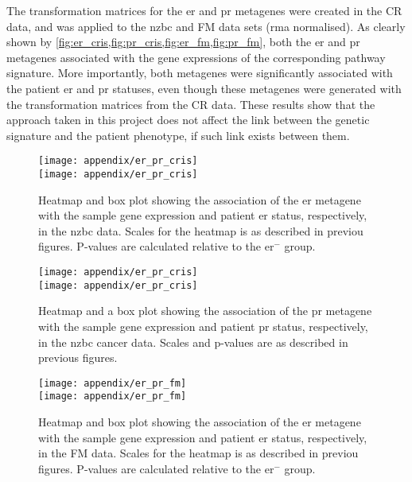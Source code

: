\begin{appendices}
The transformation matrices for the \gls{er} and \gls{pr} metagenes were created in the CR data, and was applied to the \gls{nzbc} and FM data sets (\gls{rma} normalised).
As clearly shown by \cref{fig:er_cris,fig:pr_cris,fig:er_fm,fig:pr_fm}, both the \gls{er} and \gls{pr} metagenes associated with the gene expressions of the corresponding pathway signature.
More importantly, both metagenes were significantly associated with the patient \gls{er} and \gls{pr} statuses, even though these metagenes were generated with the transformation matrices from the CR data.
These results show that the approach taken in this project does not affect the link between the genetic signature and the patient phenotype, if such link exists between them.

	\begin{figure}[htp!]
		\centering
		\texttt{[image: appendix/er\_pr\_cris]}\\
		\hfill
		\texttt{[image: appendix/er\_pr\_cris]}
		\caption[\acrshort{er} metagene in the \gls{nzbc} data]{Heatmap and box plot showing the association of the \gls{er} metagene with the sample gene expression and patient \gls{er} status, respectively, in the \gls{nzbc} data.
		Scales for the heatmap is as described in previou figures.
		P-values  are calculated relative to the \gls{er}$^-$ group.}
		\label{fig:er_cris}
	\end{figure}

	\begin{figure}[htp!]
		\centering
		\texttt{[image: appendix/er\_pr\_cris]}\\
		\hfill
		\texttt{[image: appendix/er\_pr\_cris]}
		\caption[\acrshort{pr} metagene in the \gls{nzbc} data]{Heatmap and a box plot showing the association of the \gls{pr} metagene with the sample gene expression and patient \gls{pr} status, respectively, in the \gls{nzbc} cancer data.
		Scales and  p-values are as described in previous figures.}
		\label{fig:pr_cris}
	\end{figure}

	\begin{figure}[htp!]
		\centering
		\texttt{[image: appendix/er\_pr\_fm]}\\
		\hfill
		\texttt{[image: appendix/er\_pr\_fm]}
		\caption[\acrshort{er} metagene in the FM data]{Heatmap and box plot showing the association of the \gls{er} metagene with the sample gene expression and patient \gls{er} status, respectively, in the FM data.
		Scales for the heatmap is as described in previou figures.
		P-values  are calculated relative to the \gls{er}$^-$ group.}
		\label{fig:er_fm}
	\end{figure}


\end{appendices}
